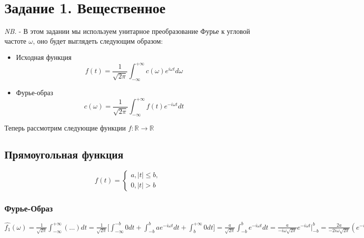 \chapter{Задание 1. Вещественное}
\label{ch:chap2}


\lstset{style=mystyle}


\textit{NB.} - В этом задании мы используем унитарное преобразование Фурье к угловой частоте $\omega$, оно будет выглядеть следующим образом: 

\begin{itemize}
    \item Исходная функция
    $$
    f(t) = \frac{1}{\sqrt{2\pi}}\int^{+\infty}_{-\infty}c(\omega)e^{i\omega t}d\omega
    $$
    \item Фурье-образ
    $$
    c(\omega) = \frac{1}{\sqrt{2\pi}}\int^{+\infty}_{-\infty}f(t)e^{-i\omega t}dt
    $$

  \end{itemize}

Теперь рассмотрим следующие функции $f: \mathbb{R} \rightarrow \mathbb{R}$

\section{Прямоугольная функция}
$$
f(t) = \begin{cases}
    a, |t| \leq b, \\
    0, |t|>b
\end{cases}
$$

\subsection{Фурье-Образ}
$\hat{f_1}(\omega) = \frac{1}{\sqrt{2\pi}}\int^{+\infty}_{-\infty}(\dots)dt = \frac{1}{\sqrt{2\pi}}\bigg[\int^{-b}_{-\infty}0 dt + \int^{b}_{-b}ae^{-i\omega t}dt + \int^{+\infty}_{b}0 dt \bigg]=
\frac{a}{\sqrt{2\pi}}\int^{b}_{-b}e^{-i\omega t}dt = \frac{a}{-i\omega \sqrt{2\pi}}e^{-i\omega t}\Bigr|_{-b}^{b} = \frac{2a}{-2i\omega \sqrt{2\pi}}(e^{-i\omega b} - e^{i\omega b}) = \frac{2ab}{2ib\omega \sqrt{2\pi}}(e^{i\omega b} - e^{-i\omega b}) = 
\frac{2ab}{b\omega \sqrt{2\pi}}sin(\omega b) = \frac{2ab}{\sqrt{2\pi}}\cdot sinc(\omega b)$

